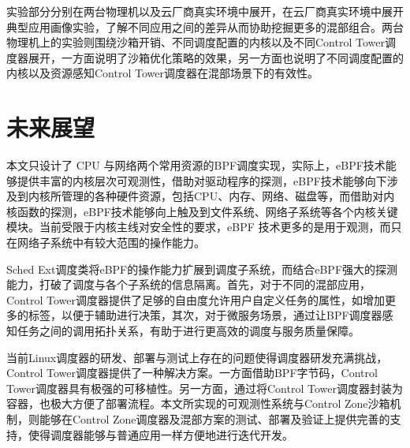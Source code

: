 实验部分分别在两台物理机以及云厂商真实环境中展开，在云厂商真实环境中展开典型应用画像实验，了解不同应用之间的差异从而协助挖掘更多的混部组合。两台物理机上的实验则围绕沙箱开销、不同调度配置的内核以及不同Control Tower调度器展开，一方面说明了沙箱优化策略的效果，另一方面也说明了不同调度配置的内核以及资源感知Control Tower调度器在混部场景下的有效性。

\section{未来展望}

本文只设计了 CPU 与网络两个常用资源的BPF调度实现，实际上，eBPF技术能够提供丰富的内核层次可观测性，借助对驱动程序的探测，eBPF技术能够向下涉及到内核所管理的各种硬件资源，包括CPU、内存、网络、磁盘等，而借助对内核函数的探测，eBPF技术能够向上触及到文件系统、网络子系统等各个内核关键模块。当前受限于内核主线对安全性的要求，eBPF 技术更多的是用于观测，而只在网络子系统中有较大范围的操作能力。

Sched Ext调度类将eBPF的操作能力扩展到调度子系统，而结合eBPF强大的探测能力，打破了调度与各个子系统的信息隔离。首先，对于不同的混部应用，Control Tower调度器提供了足够的自由度允许用户自定义任务的属性，如增加更多的标签，以便于辅助进行决策，其次，对于微服务场景，通过让BPF调度器感知任务之间的调用拓扑关系，有助于进行更高效的调度与服务质量保障。

当前Linux调度器的研发、部署与测试上存在的问题使得调度器研发充满挑战，Control Tower调度器提供了一种解决方案。一方面借助BPF字节码，Control Tower调度器具有极强的可移植性。另一方面，通过将Control Tower调度器封装为容器，也极大方便了部署流程。本文所实现的可观测性系统与Control Zone沙箱机制，则能够在Control Zone调度器及混部方案的测试、部署及验证上提供完善的支持，使得调度器能够与普通应用一样方便地进行迭代开发。
